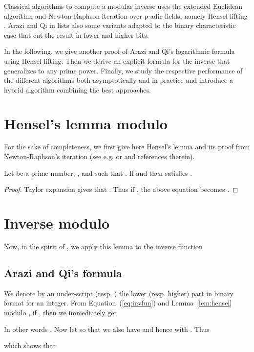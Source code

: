 Classical algorithms to compute a modular inverse uses the
extended Euclidean algorithm and Newton-Raphson iteration over p-adic fields, namely Hensel lifting \cite{Krishnamurthy:1983:padic}.
Arazi and Qi in \cite{Arazi:2008:CMI} lists also some variants adapted to the binary characteristic case that cut the result in lower and higher bits.

In the following, we give another proof of Arazi and Qi's logarithmic formula
using Hensel lifting. 
Then we derive an explicit formula for the inverse that generalizes to any prime
power. Finally, we study the respective performance of the different algorithms
both asymptotically and in practice and introduce a hybrid algorithm combining
the best approaches. 

\section{Hensel's lemma modulo \texorpdfstring{}{p{\textasciicircum}m}}
For the sake of completeness, we first give here Hensel's lemma and
its proof from Newton-Raphson's iteration (see
e.g. \cite[Theorem 7.7.1]{Bach:1996:ANTEA} or \cite[\S 4.2]{Brent:2011:MCA} and
references therein). 
\begin{lemma}[Hensel]\label{lem:hensel} 
Let  be a prime number, ,  and 
such that . If  and  then
 satisfies .
\end{lemma}
\begin{proof}
Taylor expansion gives that
. Thus if
, 
the above equation becomes .
\end{proof}

\section{Inverse modulo \texorpdfstring{}{2{\textasciicircum}m}}
Now, in the spirit of \cite{Xenophontos:2010:fixed}, we apply this lemma to the
inverse function 


\subsection{Arazi and Qi's formula}
We denote by an under-script  (resp. ) the lower (resp. higher)
part in binary format for an integer.
From Equation~(\ref{eq:invfun}) and Lemma~\ref{lem:hensel} modulo ,
if , then we immediately get

In other words 
. Now let  so that we
also have  and hence  with
. Thus

which shows that 

